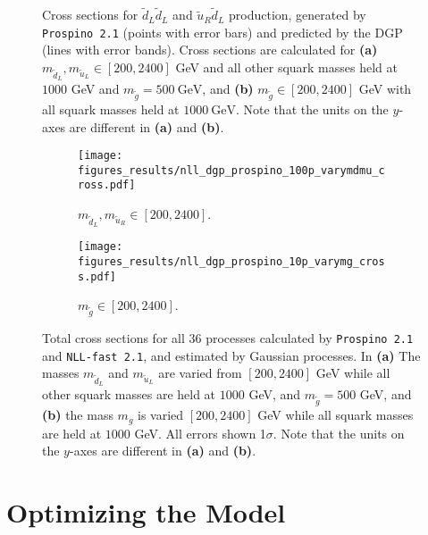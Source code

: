 \documentclass[twoside,english]{uiofysmaster}
\begin{document}
{{\begin{figure}
    \caption{Cross sections for $\widetilde{d}_L \widetilde{d}_L$ and $\widetilde{u}_R \widetilde{d}_L$ production, generated by {\tt Prospino 2.1} (points with error bars) and predicted by the DGP (lines with error bands). Cross sections are calculated for \textbf{(a)} $m_{\widetilde{d}_L}, m_{\widetilde{u}_L} \in [200, 2400]$ GeV and all other squark masses held at $1000$ GeV and $m_{\tilde{g}}=500~\mathrm{GeV}$, and \textbf{(b)} $m_{\tilde{g}} \in [200, 2400]$ GeV with all squark masses held at $ 1000~\mathrm{GeV}$. Note that the units on the $y$-axes are different in \textbf{(a)} and \textbf{(b)}.}\label{Fig:: results : dLuR dLdL cross sections}
\end{figure}


\begin{figure}
    \centering
    \begin{subfigure}[b]{0.9\textwidth}
        \texttt{[image: figures\_results/nll\_dgp\_prospino\_100p\_varymdmu\_cross.pdf]}
\caption{$m_{\widetilde{d}_L}, m_{\widetilde{u}_R} \in [200, 2400]$.}
\label{Fig:: results : total prospino dgp vary mdL}
    \end{subfigure}

    \begin{subfigure}[b]{0.9\textwidth}
    \centering
        \texttt{[image: figures\_results/nll\_dgp\_prospino\_10p\_varymg\_cross.pdf]}
\caption{$m_{\widetilde{g}} \in [200, 2400]$.}
\label{Fig:: results : total prospino dgp varymg}
    \end{subfigure}

    \caption{Total cross sections for all 36 processes calculated by {\tt Prospino 2.1} and {\tt NLL-fast 2.1}, and estimated by Gaussian processes. In \textbf{(a)} The masses $m_{\widetilde{d}_L}$ and $m_{\widetilde{u}_L}$ are varied from $[200, 2400]$ GeV while all other squark masses are held at $1000$ GeV, and $m_{\widetilde{g}}=500$ GeV, and \textbf{(b)} the mass $m_{g}$ is varied $[200, 2400]$ GeV while all squark masses are held at $1000$ GeV. All errors shown 1$\sigma$. Note that the units on the $y$-axes are different in \textbf{(a)} and \textbf{(b)}.}\label{Fig:: results : total cross sections}
\end{figure}





\section{Optimizing the Model}\label{Sec:: results : The Optimal Model}

}}
\end{document}

